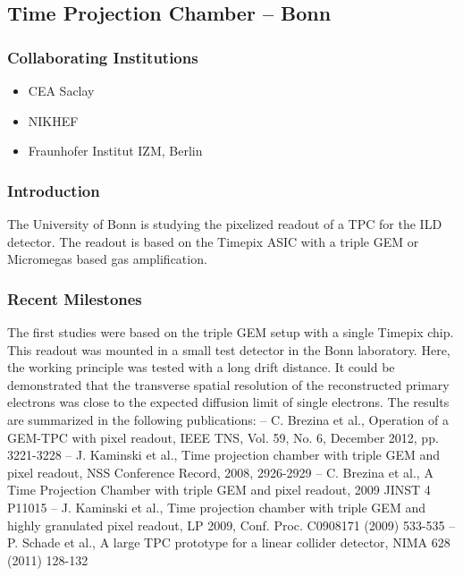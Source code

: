 \subsection{Time Projection Chamber -- Bonn}
\subsubsection{Collaborating Institutions}
\begin{itemize}
	\item CEA Saclay
	\item NIKHEF
	\item Fraunhofer Institut IZM, Berlin
\end{itemize}
\subsubsection{Introduction}
The University of Bonn is studying the pixelized readout of a TPC for the ILD detector. The readout is based on the Timepix ASIC with a triple GEM or Micromegas based gas amplification.

\subsubsection{Recent Milestones}
The first studies were based on the triple GEM setup with a single Timepix chip. This readout was mounted in a small test detector in the Bonn laboratory. Here, the working principle was tested with a long drift distance. It could be demonstrated that the transverse spatial resolution of the reconstructed primary electrons was close to the expected diffusion limit of single electrons. The results are summarized in the following publications:
– C. Brezina et al., Operation of a GEM-TPC with pixel readout, IEEE TNS, Vol. 59, No. 6, December 2012, pp. 3221-3228
– J. Kaminski et al., Time projection chamber with triple GEM and pixel readout, NSS Conference Record, 2008, 2926-2929
– C. Brezina et al., A Time Projection Chamber with triple GEM and pixel readout, 2009 JINST 4 P11015
– J. Kaminski et al., Time projection chamber with triple GEM and highly granulated pixel readout, LP 2009, Conf. Proc. C0908171 (2009) 533-535
– P. Schade et al., A large TPC prototype for a linear collider detector, NIMA 628 (2011) 128-132

